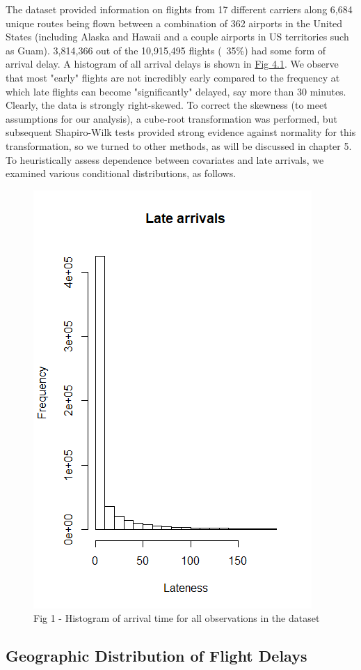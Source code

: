 \documentclass[12pt, a4paper, openany]{book}
\newcommand\tab[1][1cm]{\hspace*{#1}}
\begin{document}
	\tab The dataset provided information on flights from 17 different carriers along 6,684 unique routes being flown between a combination of 362 airports in the United States (including Alaska and Hawaii and a couple airports in US territories such as Guam). 3,814,366 out of the 10,915,495 flights (~35\%) had some form of arrival delay. A histogram of all arrival delays is shown in \underline{Fig 4.1}. We observe that most "early" flights are not incredibly early compared to the frequency at which late flights can become "significantly" delayed, say more than 30 minutes. Clearly, the data is strongly right-skewed. To correct the skewness (to meet assumptions for our analysis), a cube-root transformation was performed, but subsequent Shapiro-Wilk tests provided strong evidence against normality for this transformation, so we turned to other methods, as will be discussed in chapter 5. To heuristically assess dependence between covariates and late arrivals, we examined various conditional distributions, as follows.\\
	\begin{figure}
	\centering
	 \includegraphics[width = .45 \textwidth]{../figures/LateArrivalsHistogram}
	 \caption{Fig 1 - Histogram of arrival time for all observations in the dataset}
	 \end{figure}
	 
		\subsection{Geographic Distribution of Flight Delays}
		
\end{document}
